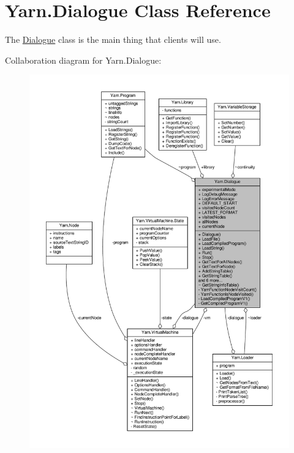 \hypertarget{a00082}{\section{Yarn.\-Dialogue Class Reference}
\label{a00082}
}


The \hyperlink{a00082}{Dialogue} class is the main thing that clients will use.  




Collaboration diagram for Yarn.\-Dialogue\-:
\nopagebreak
\begin{figure}[H]
\begin{center}
\leavevmode
\includegraphics[width=350pt]{a00600}
\end{center}
\end{figure}
